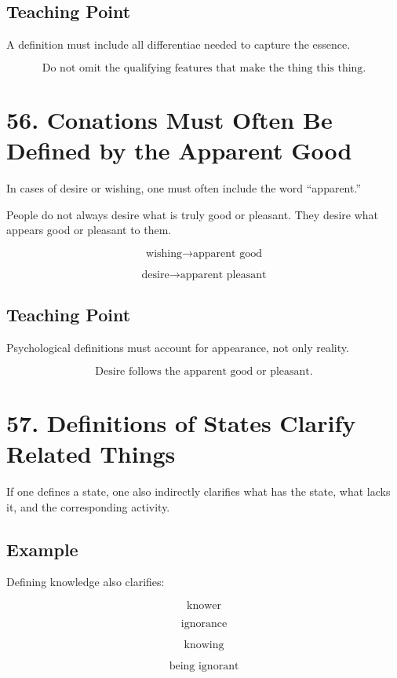 \documentclass[12pt]{article}
\begin{document}
\subsection*{Teaching Point}

A definition must include all differentiae needed to capture the essence.

\[
\boxed{
\text{Do not omit the qualifying features that make the thing this thing.}
}
\]

\section*{56. Conations Must Often Be Defined by the Apparent Good}

In cases of desire or wishing, one must often include the word ``apparent.''

People do not always desire what is truly good or pleasant. They desire what
appears good or pleasant to them.

\[
\text{wishing} \rightarrow \text{apparent good}
\]

\[
\text{desire} \rightarrow \text{apparent pleasant}
\]

\subsection*{Teaching Point}

Psychological definitions must account for appearance, not only reality.

\[
\boxed{
\text{Desire follows the apparent good or pleasant.}
}
\]

\section*{57. Definitions of States Clarify Related Things}

If one defines a state, one also indirectly clarifies what has the state, what
lacks it, and the corresponding activity.

\subsection*{Example}

Defining knowledge also clarifies:

\[
\text{knower}
\]

\[
\text{ignorance}
\]

\[
\text{knowing}
\]

\[
\text{being ignorant}
\]
\end{document}
